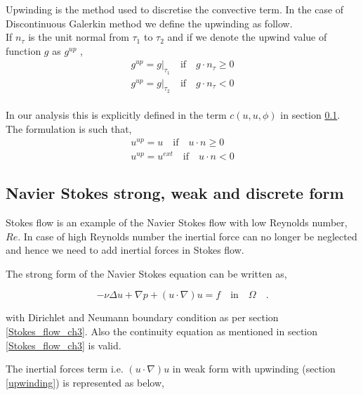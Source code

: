 \documentclass[a4paper,openany]{book}
\begin{document}
Upwinding is the method used to discretise the convective term. In the case of Discontinuous Galerkin method we define the upwinding as follow.\\

If $n_\tau$ is the unit normal from $\tau_1$ to $\tau_2$ and if we denote the upwind value of function $g$ as $g^{up}$ \cite{riviere},
\begin{equation}
\begin{split}
g^{up} = g|_{\tau_1} \quad \textrm{if} \quad g \cdot n_\tau \geq 0 \\
g^{up} = g|_{\tau_2} \quad \textrm{if} \quad g \cdot n_\tau < 0
\end{split}
\end{equation}
\\
In our analysis this is explicitly defined in the term $c(u,u,\phi)$ in section \ref{n_s_ch3}. The formulation is such that,
\begin{equation}
\begin{split}
u^{up} = u \quad \textrm{if} \quad u \cdot n \geq 0 \\
u^{up} = u^{ext} \quad \textrm{if} \quad u \cdot n < 0
\end{split}
\end{equation}

\subsection{Navier Stokes strong, weak and discrete form} \label{n_s_ch3}

Stokes flow is an example of the Navier Stokes flow with low Reynolds number, $Re$. In case of high Reynolds number the inertial force can no longer be neglected and hence we need to add inertial forces in Stokes flow. 

The strong form of the Navier Stokes equation can be written as,

\begin{equation} \label{navier_stokes_strong_ch3}
-\nu \Delta u + \nabla p + (u \cdot \nabla) u = f \quad \textrm{in} \quad \Omega \quad \textrm{.}
\end{equation}

with Dirichlet and Neumann boundary condition as per section \ref{Stokes_flow_ch3}. Also the continuity equation as mentioned in section \ref{Stokes_flow_ch3} is valid.

The inertial forces term i.e. $(u \cdot \nabla) u$ in weak form with upwinding (section \ref{upwinding}) is represented as below,
\end{document}
